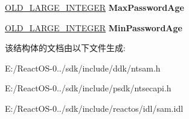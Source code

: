 \begin{DoxyCompactItemize}
\item 
\mbox{\label{struct___d_o_m_a_i_n___p_a_s_s_w_o_r_d___i_n_f_o_r_m_a_t_i_o_n_aaeda7120b64ef25e5aec8b1cc5f0c31a}} 
\hyperlink{struct___o_l_d___l_a_r_g_e___i_n_t_e_g_e_r}{O\+L\+D\+\_\+\+L\+A\+R\+G\+E\+\_\+\+I\+N\+T\+E\+G\+ER} {\bfseries Max\+Password\+Age}
\item 
\mbox{\label{struct___d_o_m_a_i_n___p_a_s_s_w_o_r_d___i_n_f_o_r_m_a_t_i_o_n_a080e39fd05116570a81849942f66f437}} 
\hyperlink{struct___o_l_d___l_a_r_g_e___i_n_t_e_g_e_r}{O\+L\+D\+\_\+\+L\+A\+R\+G\+E\+\_\+\+I\+N\+T\+E\+G\+ER} {\bfseries Min\+Password\+Age}
\end{DoxyCompactItemize}


该结构体的文档由以下文件生成\+:\begin{DoxyCompactItemize}
\item 
E\+:/\+React\+O\+S-\/0../sdk/include/ddk/ntsam.\+h\item 
E\+:/\+React\+O\+S-\/0../sdk/include/psdk/ntsecapi.\+h\item 
E\+:/\+React\+O\+S-\/0../sdk/include/reactos/idl/sam.\+idl\end{DoxyCompactItemize}
